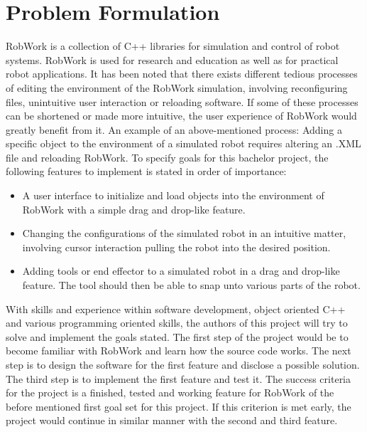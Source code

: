 \section{Problem Formulation}

RobWork is a collection of C++ libraries for simulation and control of robot systems. RobWork is used for research and education as well as for practical robot applications. It has been noted that there exists different tedious processes of editing the environment of the RobWork simulation, involving reconfiguring files, unintuitive user interaction or reloading software. If some of these processes can be shortened or made more intuitive, the user experience of RobWork would greatly benefit from it.
An example of an above-mentioned process: Adding a specific object to the environment of a simulated robot requires altering an .XML file and reloading RobWork.    
To specify goals for this bachelor project, the following features to implement is stated in order of importance:

\begin{itemize}
\item A user interface to initialize and load objects into the environment of RobWork with a simple drag and drop-like feature. 
\item Changing the configurations of the simulated robot in an intuitive matter, involving cursor interaction pulling the robot into the desired position.
\item Adding tools or end effector to a simulated robot in a drag and drop-like 
feature. The tool should then be able to snap unto various parts of the robot.
\end{itemize}

With skills and experience within software development, object oriented C++ and various programming oriented skills, the authors of this project will try to solve and implement the goals stated. The first step of the project would be to become familiar with RobWork and learn how the source code works. The next step is to design the software for the first feature and disclose a possible solution. The third step is to implement the first feature and test it.
 The success criteria for the project is a finished, tested and working feature for RobWork of the before mentioned first goal set for this project. If this criterion is met early, the project would continue in similar manner with the second and third feature.

\clearpage